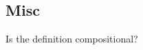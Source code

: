 \documentclass[12pt,a4paper]{article}
\begin{document}

\subsection*{Misc}

Is the definition compositional? 
\end{document}
